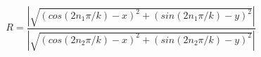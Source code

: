 \documentclass[11pt]{article}
\begin{document}
\begin{solution}
\begin{enumerate}
    $$ R = \frac{|\sqrt{(cos(2n_1\pi/k) - x)^2 + (sin(2n_1\pi/k) - y)^2}|}{|\sqrt{(cos(2n_2\pi/k) - x)^2 + (sin(2n_2\pi/k) - y)^2}|} $$
    \end{enumerate}
\end{solution}
\end{document}
